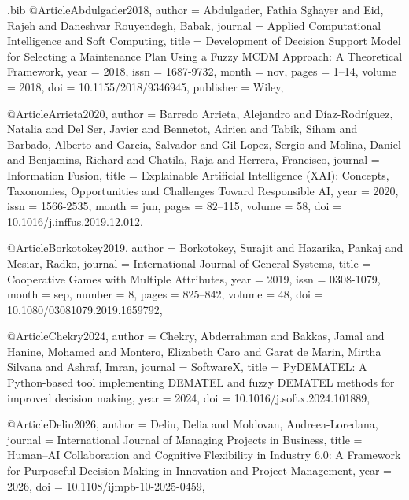 
\begin{filecontents*}[overwrite]{\jobname.bib}
@Article{Abdulgader2018,
  author    = {Abdulgader, Fathia Sghayer and Eid, Rajeh and Daneshvar Rouyendegh, Babak},
  journal   = {Applied Computational Intelligence and Soft Computing},
  title     = {Development of Decision Support Model for Selecting a Maintenance Plan Using a Fuzzy {MCDM} Approach: A Theoretical Framework},
  year      = {2018},
  issn      = {1687-9732},
  month     = nov,
  pages     = {1--14},
  volume    = {2018},
  doi       = {10.1155/2018/9346945},
  publisher = {Wiley},
}

@Article{Arrieta2020,
  author  = {Barredo Arrieta, Alejandro and D{\'i}az-Rodr{\'i}guez, Natalia and Del Ser, Javier and Bennetot, Adrien and Tabik, Siham and Barbado, Alberto and Garcia, Salvador and Gil-Lopez, Sergio and Molina, Daniel and Benjamins, Richard and Chatila, Raja and Herrera, Francisco},
  journal = {Information Fusion},
  title   = {Explainable {Artificial Intelligence} ({XAI}): Concepts, Taxonomies, Opportunities and Challenges Toward Responsible {AI}},
  year    = {2020},
  issn    = {1566-2535},
  month   = jun,
  pages   = {82--115},
  volume  = {58},
  doi     = {10.1016/j.inffus.2019.12.012},
}

@Article{Borkotokey2019,
  author  = {Borkotokey, Surajit and Hazarika, Pankaj and Mesiar, Radko},
  journal = {International Journal of General Systems},
  title   = {Cooperative Games with Multiple Attributes},
  year    = {2019},
  issn    = {0308-1079},
  month   = sep,
  number  = {8},
  pages   = {825--842},
  volume  = {48},
  doi     = {10.1080/03081079.2019.1659792},
}

@Article{Chekry2024,
  author  = {Chekry, Abderrahman and Bakkas, Jamal and Hanine, Mohamed and Montero, Elizabeth Caro and {Garat de Marin}, Mirtha Silvana and Ashraf, Imran},
  journal = {SoftwareX},
  title   = {{PyDEMATEL}: A {Python}-based tool implementing {DEMATEL} and fuzzy {DEMATEL} methods for improved decision making},
  year    = {2024},
  doi     = {10.1016/j.softx.2024.101889},
}

@Article{Deliu2026,
  author  = {Deliu, Delia and Moldovan, Andreea-Loredana},
  journal = {International Journal of Managing Projects in Business},
  title   = {Human--{AI} Collaboration and Cognitive Flexibility in Industry 6.0: A Framework for Purposeful Decision-Making in Innovation and Project Management},
  year    = {2026},
  doi     = {10.1108/ijmpb-10-2025-0459},
}


\end{filecontents*}

